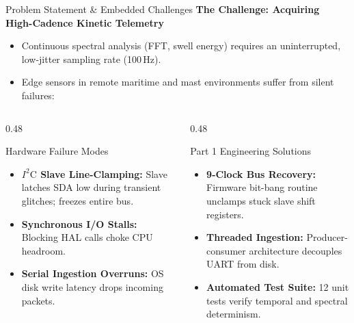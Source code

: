 \documentclass[aspectratio=169, 10pt]{beamer}
\begin{document}
\begin{frame}{Problem Statement \& Embedded Challenges}
    \textbf{The Challenge: Acquiring High-Cadence Kinetic Telemetry}
    \begin{itemize}
        \item Continuous spectral analysis (FFT, swell energy) requires an uninterrupted, low-jitter sampling rate (100\,Hz).
        \item Edge sensors in remote maritime and mast environments suffer from silent failures:
    \end{itemize}
    \vspace{0.2cm}
    \begin{columns}[T]
        \begin{column}{0.48\textwidth}
            \begin{block}{Hardware Failure Modes}
                \begin{itemize}
                    \item \textbf{$I^2\text{C}$ Slave Line-Clamping:} Slave latches SDA low during transient glitches; freezes entire bus.
                    \item \textbf{Synchronous I/O Stalls:} Blocking HAL calls choke CPU headroom.
                    \item \textbf{Serial Ingestion Overruns:} OS disk write latency drops incoming packets.
                \end{itemize}
            \end{block}
        \end{column}
        \begin{column}{0.48\textwidth}
            \begin{exampleblock}{Part 1 Engineering Solutions}
                \begin{itemize}
                    \item \textbf{9-Clock Bus Recovery:} Firmware bit-bang routine unclamps stuck slave shift registers.
                    \item \textbf{Threaded Ingestion:} Producer-consumer architecture decouples UART from disk.
                    \item \textbf{Automated Test Suite:} 12 unit tests verify temporal and spectral determinism.
                \end{itemize}
            \end{exampleblock}
        \end{column}
    \end{columns}
\end{frame}
\end{document}

